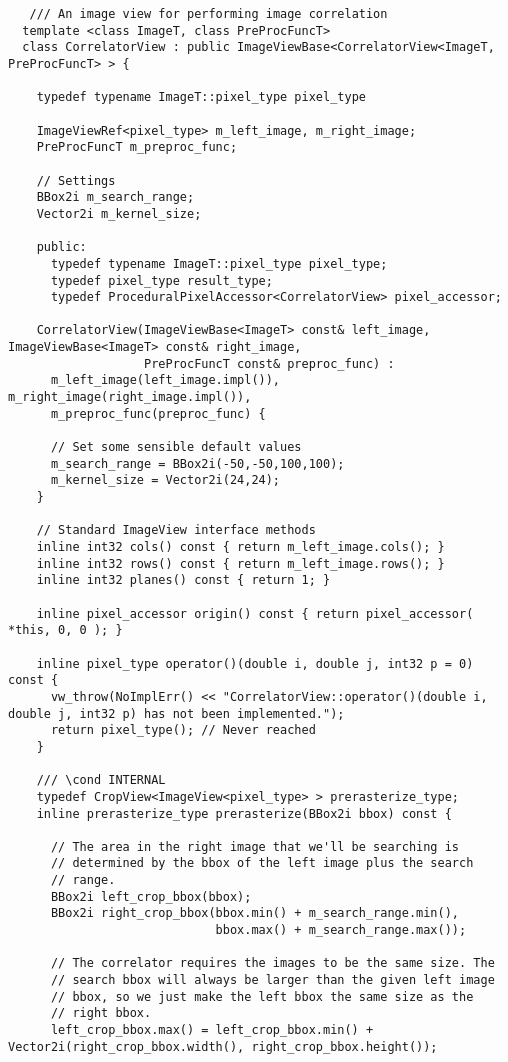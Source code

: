 \begin{verbatim}
   /// An image view for performing image correlation
  template <class ImageT, class PreProcFuncT>
  class CorrelatorView : public ImageViewBase<CorrelatorView<ImageT, PreProcFuncT> > {

    typedef typename ImageT::pixel_type pixel_type

    ImageViewRef<pixel_type> m_left_image, m_right_image;
    PreProcFuncT m_preproc_func;

    // Settings
    BBox2i m_search_range;
    Vector2i m_kernel_size;

    public:
      typedef typename ImageT::pixel_type pixel_type;
      typedef pixel_type result_type;
      typedef ProceduralPixelAccessor<CorrelatorView> pixel_accessor;
      
    CorrelatorView(ImageViewBase<ImageT> const& left_image, ImageViewBase<ImageT> const& right_image, 
                   PreProcFuncT const& preproc_func) :
      m_left_image(left_image.impl()), m_right_image(right_image.impl()), 
      m_preproc_func(preproc_func) {

      // Set some sensible default values
      m_search_range = BBox2i(-50,-50,100,100);
      m_kernel_size = Vector2i(24,24);
    }

    // Standard ImageView interface methods
    inline int32 cols() const { return m_left_image.cols(); }
    inline int32 rows() const { return m_left_image.rows(); }
    inline int32 planes() const { return 1; }
    
    inline pixel_accessor origin() const { return pixel_accessor( *this, 0, 0 ); }
    
    inline pixel_type operator()(double i, double j, int32 p = 0) const {
      vw_throw(NoImplErr() << "CorrelatorView::operator()(double i, double j, int32 p) has not been implemented.");
      return pixel_type(); // Never reached
    }

    /// \cond INTERNAL
    typedef CropView<ImageView<pixel_type> > prerasterize_type;
    inline prerasterize_type prerasterize(BBox2i bbox) const {

      // The area in the right image that we'll be searching is
      // determined by the bbox of the left image plus the search
      // range.
      BBox2i left_crop_bbox(bbox);
      BBox2i right_crop_bbox(bbox.min() + m_search_range.min(),
                             bbox.max() + m_search_range.max());
      
      // The correlator requires the images to be the same size. The
      // search bbox will always be larger than the given left image
      // bbox, so we just make the left bbox the same size as the
      // right bbox.
      left_crop_bbox.max() = left_crop_bbox.min() + Vector2i(right_crop_bbox.width(), right_crop_bbox.height());


\end{verbatim}
